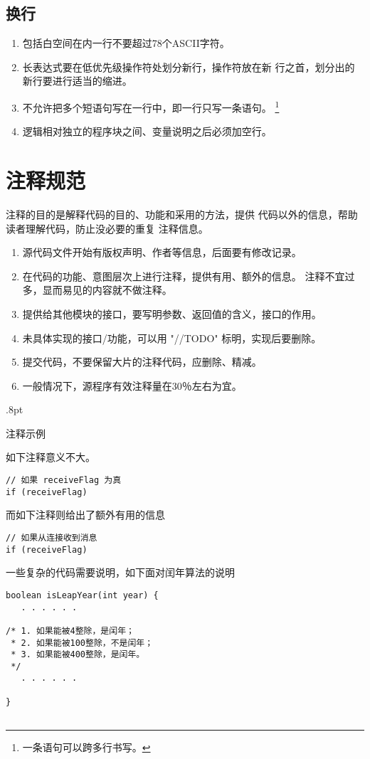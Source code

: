 \documentclass[a4paper,12pt]{article}
\begin{document}
\subsection{换行}
\begin{enumerate}
    \item 包括白空间在内一行不要超过78个ASCII字符。
    \item 长表达式要在低优先级操作符处划分新行，操作符放在新
        行之首，划分出的新行要进行适当的缩进。
    \item 不允许把多个短语句写在一行中，即一行只写一条语句。
        \footnote{一条语句可以跨多行书写。}
    \item 逻辑相对独立的程序块之间、变量说明之后必须加空行。
\end{enumerate}
\section{注释规范}
注释的目的是解释代码的目的、功能和采用的方法，提供
代码以外的信息，帮助读者理解代码，防止没必要的重复
注释信息。

\begin{enumerate}
    \item 源代码文件开始有版权声明、作者等信息，后面要有修改记录。
    \item 在代码的功能、意图层次上进行注释，提供有用、额外的信息。
        注释不宜过多，显而易见的内容就不做注释。
    \item 提供给其他模块的接口，要写明参数、返回值的含义，接口的作用。
    \item 未具体实现的接口/功能，可以用 "//TODO" 标明，实现后要删除。
    \item 提交代码，不要保留大片的注释代码，应删除、精减。
    \item 一般情况下，源程序有效注释量在30％左右为宜。
\end{enumerate}
\columnseprule.8pt 
\caption{注释示例}
\begin{multicols}{2}
\hfill
如下注释意义不大。
\begin{lstlisting}[numbers=none,basicstyle=\small, backgroundcolor=\color{yellow}] 
// 如果 receiveFlag 为真
if (receiveFlag)
\end{lstlisting}

\vskip9pt
而如下注释则给出了额外有用的信息 
\begin{lstlisting}[numbers=none,basicstyle=\small,
    backgroundcolor=\color{yellow}]
// 如果从连接收到消息 
if (receiveFlag)
\end{lstlisting}

\vskip9pt
一些复杂的代码需要说明，如下面对闰年算法的说明
\begin{lstlisting}[numbers=none,basicstyle=\scriptsize,
 backgroundcolor=\color{yellow}]
boolean isLeapYear(int year) {
   . . . . . .

/* 1. 如果能被4整除，是闰年；
 * 2. 如果能被100整除，不是闰年；
 * 3. 如果能被400整除，是闰年。
 */
   . . . . . . 

}
 
\end{lstlisting}
\end{multicols}
\end{document}
